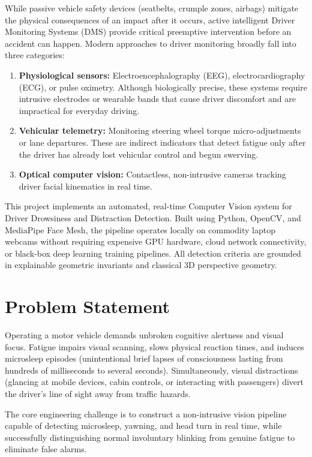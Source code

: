 \documentclass[11pt,a4paper]{article}
\begin{document}
While passive vehicle safety devices (seatbelts, crumple zones, airbags) mitigate the physical consequences of an impact after it occurs, active intelligent Driver Monitoring Systems (DMS) provide critical preemptive intervention before an accident can happen. Modern approaches to driver monitoring broadly fall into three categories:
\begin{enumerate}
    \item \textbf{Physiological sensors:} Electroencephalography (EEG), electrocardiography (ECG), or pulse oximetry. Although biologically precise, these systems require intrusive electrodes or wearable bands that cause driver discomfort and are impractical for everyday driving.
    \item \textbf{Vehicular telemetry:} Monitoring steering wheel torque micro-adjustments or lane departures. These are indirect indicators that detect fatigue only after the driver has already lost vehicular control and begun swerving.
    \item \textbf{Optical computer vision:} Contactless, non-intrusive cameras tracking driver facial kinematics in real time.
\end{enumerate}

This project implements an automated, real-time Computer Vision system for Driver Drowsiness and Distraction Detection. Built using Python, OpenCV, and MediaPipe Face Mesh, the pipeline operates locally on commodity laptop webcams without requiring expensive GPU hardware, cloud network connectivity, or black-box deep learning training pipelines. All detection criteria are grounded in explainable geometric invariants and classical 3D perspective geometry.

\section{Problem Statement}
Operating a motor vehicle demands unbroken cognitive alertness and visual focus. Fatigue impairs visual scanning, slows physical reaction times, and induces microsleep episodes (unintentional brief lapses of consciousness lasting from hundreds of milliseconds to several seconds). Simultaneously, visual distractions (glancing at mobile devices, cabin controls, or interacting with passengers) divert the driver's line of sight away from traffic hazards.

The core engineering challenge is to construct a non-intrusive vision pipeline capable of detecting microsleep, yawning, and head turn in real time, while successfully distinguishing normal involuntary blinking from genuine fatigue to eliminate false alarms.
\end{document}
